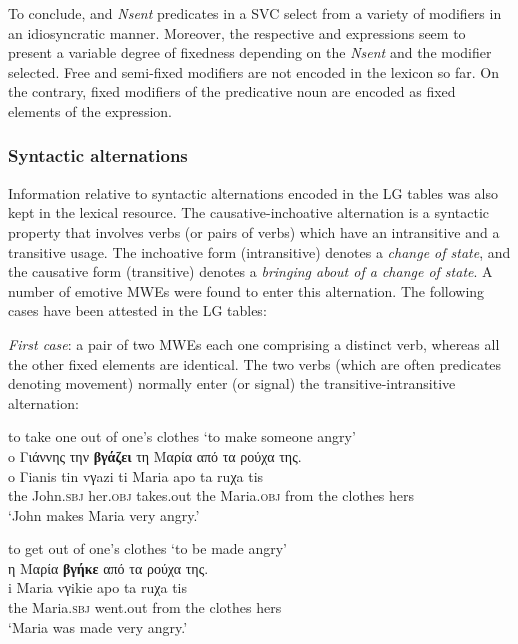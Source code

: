 \documentclass[output=paper]{langsci/langscibook}
\begin{document}
To conclude,  and  \textit{Nsent} predicates in a SVC select from
a variety of modifiers in an idiosyncratic manner. Moreover, the
respective  and  expressions seem to present a variable degree of
fixedness depending on the \textit{Nsent} and the modifier selected.
Free and semi-fixed modifiers are not encoded in the lexicon so far. On
the contrary, fixed modifiers of the predicative noun are encoded as
fixed elements of the expression.


\subsubsection{Syntactic alternations}

Information relative to syntactic alternations encoded in the LG tables
was also kept in the lexical resource.  The
 causative-inchoative alternation is a syntactic property that involves
verbs (or pairs of verbs) which have an intransitive and a transitive
usage. The inchoative form (intransitive) denotes a \textit{change of
state}, and the causative form (transitive) denotes a \textit{bringing about of a
change of state}. A number of emotive MWEs were found to enter this
alternation. The following cases have been attested in the LG tables:

\textit{First case}: a pair of two MWEs each one comprising a distinct verb, whereas all the
other fixed elements are identical. The two verbs (which are often
predicates denoting movement) normally enter (or signal) the
transitive-intransitive alternation:

\begin{exe}
\settowidth {}
\ex \label{ex:3:29}
to take one out of one's clothes `to make someone angry'\\
\glll o Γιάννης την \textbf{βγάζει} τη Μαρία από τα ρούχα της.  \\
o Γianis tin vγazi ti Maria apo ta ruχa tis {}\\
the John.\textsc{sbj} her.\textsc{obj}  takes.out the Maria.\textsc{obj} from the clothes hers {}\\
\glt %
‘John makes Maria very angry.’
\end{exe}

\begin{exe}
\settowidth {}
\ex \label{ex:3:30}
to get out of one's clothes `to be made angry'\\
\glll η Μαρία \textbf{βγήκε} από τα ρούχα της.  \\
i Maria vγikie apo ta ruχa tis {}\\
the Maria.\textsc{sbj} went.out from the clothes hers {}\\ 
\glt %
‘Maria was made very angry.’
\end{exe}
\end{document}
